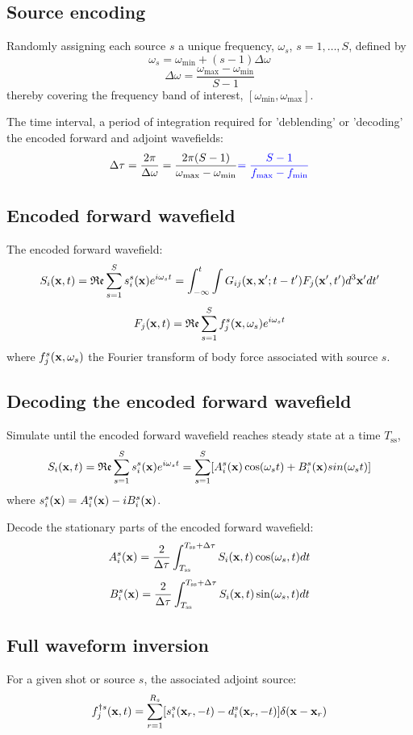 \subsection{Source encoding}
Randomly assigning each source $s$ a unique frequency, $\omega_s$,
$s=1,\ldots,S$, defined by
\[ \omega_s = \omega_{\text{min}} + (s - 1) \Delta\omega \]
\[ \Delta\omega = \frac{\omega_{\text{max}} - \omega_{\text{min}}}{S - 1} \]
thereby covering the frequency band of interest,
$[\omega_{\text{min}}, \omega_{\text{max}}]$.

The time interval, a period of integration required for 'deblending' or
'decoding' the encoded forward and adjoint wavefields:
\[ \Delta\tau = \frac{2\pi}{\Delta\omega}
  = \frac{2\pi(S - 1)}{\omega_{\text{max}} - \omega_{\text{min}}}
  {\color{blue} = \frac{S - 1}{f_{\text{max}} - f_{\text{min}}} } \]

\subsection{Encoded forward wavefield}
The encoded forward wavefield:
\[ S_i(\mathbf{x}, t) = \mathfrak{Re} \sum_{s=1}^S s_i^s(\mathbf{x}) e^{i\omega_s t}
  = \int_{-\infty}^t \int G_{ij}(\mathbf{x}, \mathbf{x}'; t - t') F_j(\mathbf{x}', t')
  d^3\mathbf{x}' dt' \]
\[ F_j(\mathbf{x}, t) = \mathfrak{Re} \sum_{s=1}^S f_j^s(\mathbf{x}, \omega_s)
  e^{i\omega_s t} \]
where $f_j^s(\mathbf{x}, \omega_s)$ the Fourier transform of body force
associated with source $s$.

\subsection{Decoding the encoded forward wavefield}
Simulate until the encoded forward wavefield reaches steady state
at a time $T_\text{ss}$,
\[ S_i(\mathbf{x}, t) = \mathfrak{Re} \sum_{s=1}^S s_i^s(\mathbf{x}) e^{i\omega_s t}
  = \sum_{s=1}^S [ A_i^s(\mathbf{x}) \cos(\omega_s t)
  + B_i^s(\mathbf{x}) sin(\omega_s t) ] \]
where $s_i^s(\mathbf{x}) = A_i^s(\mathbf{x}) - i B_i^s(\mathbf{x})$.

Decode the stationary parts of the encoded forward wavefield:
\[ A_i^s(\mathbf{x}) = \frac{2}{\Delta\tau} \int_{T_\text{ss}}^{T_\text{ss}
  + \Delta\tau} S_i(\mathbf{x}, t) \cos(\omega_s, t) dt \]
\[ B_i^s(\mathbf{x}) = \frac{2}{\Delta\tau} \int_{T_\text{ss}}^{T_\text{ss}
  + \Delta\tau} S_i(\mathbf{x}, t) \sin(\omega_s, t) dt \]

\subsection{Full waveform inversion}
For a given shot or source $s$, the associated adjoint source:
\[ f_j^{\dagger s}(\mathbf{x}, t) = \sum_{r=1}^{R_s}
  [ s_i^s(\mathbf{x}_r, -t) - d_i^s(\mathbf{x}_r, -t) ] \delta(\mathbf{x} - \mathbf{x}_r) \]

